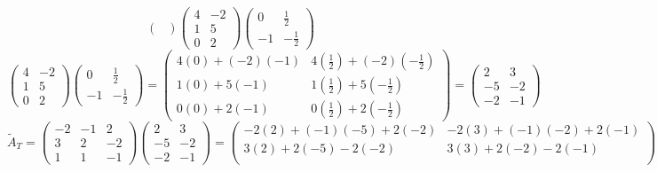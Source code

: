 \documentclass[a3paper,12pt]{extarticle} %
\begin{document}
\begin{enumerate}
\begin{enumerate}
\[\begin{pmatrix}
            \end{pmatrix} \begin{pmatrix}
                4 & -2 \\
                1 & 5 \\
                0 & 2
            \end{pmatrix} \begin{pmatrix}
                0 & \frac{1}{2} \\
                -1 & -\frac{1}{2}
            \end{pmatrix}
        \]
        \[
            \begin{pmatrix}
                4 & -2 \\
                1 & 5 \\
                0 & 2
            \end{pmatrix} \begin{pmatrix}
                0 & \frac{1}{2} \\
                -1 & -\frac{1}{2}
            \end{pmatrix} = \begin{pmatrix}
                4(0) + (-2)(-1) & 4(\frac{1}{2}) + (-2)(-\frac{1}{2}) \\
                1(0) + 5(-1) & 1(\frac{1}{2}) + 5(-\frac{1}{2}) \\
                0(0) + 2(-1) & 0(\frac{1}{2}) + 2(-\frac{1}{2})
            \end{pmatrix} = \begin{pmatrix}
                2 & 3 \\
                -5 & -2 \\
                -2 & -1
            \end{pmatrix}
        \]
        \[
            \tilde{A}_T = \begin{pmatrix}
                -2 & -1 & 2 \\
                3 & 2 & -2 \\
                1 & 1 & -1
            \end{pmatrix} \begin{pmatrix}
                2 & 3 \\
                -5 & -2 \\
                -2 & -1
            \end{pmatrix} = \begin{pmatrix}
                -2(2) + (-1)(-5) + 2(-2) & -2(3) + (-1)(-2) + 2(-1) \\
                3(2) + 2(-5) - 2(-2) & 3(3) + 2(-2) - 2(-1) \\

\end{pmatrix}\]
\end{enumerate}
\end{enumerate}
\end{document}
